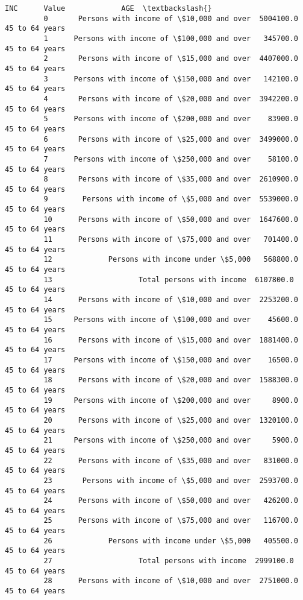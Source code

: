 \documentclass[11pt]{article}
\begin{document}
\begin{Verbatim}[commandchars=\\\{\}]
                                                     INC      Value             AGE  \textbackslash{}
         0       Persons with income of \$10,000 and over  5004100.0  45 to 64 years   
         1      Persons with income of \$100,000 and over   345700.0  45 to 64 years   
         2       Persons with income of \$15,000 and over  4407000.0  45 to 64 years   
         3      Persons with income of \$150,000 and over   142100.0  45 to 64 years   
         4       Persons with income of \$20,000 and over  3942200.0  45 to 64 years   
         5      Persons with income of \$200,000 and over    83900.0  45 to 64 years   
         6       Persons with income of \$25,000 and over  3499000.0  45 to 64 years   
         7      Persons with income of \$250,000 and over    58100.0  45 to 64 years   
         8       Persons with income of \$35,000 and over  2610900.0  45 to 64 years   
         9        Persons with income of \$5,000 and over  5539000.0  45 to 64 years   
         10      Persons with income of \$50,000 and over  1647600.0  45 to 64 years   
         11      Persons with income of \$75,000 and over   701400.0  45 to 64 years   
         12             Persons with income under \$5,000   568800.0  45 to 64 years   
         13                    Total persons with income  6107800.0  45 to 64 years   
         14      Persons with income of \$10,000 and over  2253200.0  45 to 64 years   
         15     Persons with income of \$100,000 and over    45600.0  45 to 64 years   
         16      Persons with income of \$15,000 and over  1881400.0  45 to 64 years   
         17     Persons with income of \$150,000 and over    16500.0  45 to 64 years   
         18      Persons with income of \$20,000 and over  1588300.0  45 to 64 years   
         19     Persons with income of \$200,000 and over     8900.0  45 to 64 years   
         20      Persons with income of \$25,000 and over  1320100.0  45 to 64 years   
         21     Persons with income of \$250,000 and over     5900.0  45 to 64 years   
         22      Persons with income of \$35,000 and over   831000.0  45 to 64 years   
         23       Persons with income of \$5,000 and over  2593700.0  45 to 64 years   
         24      Persons with income of \$50,000 and over   426200.0  45 to 64 years   
         25      Persons with income of \$75,000 and over   116700.0  45 to 64 years   
         26             Persons with income under \$5,000   405500.0  45 to 64 years   
         27                    Total persons with income  2999100.0  45 to 64 years   
         28      Persons with income of \$10,000 and over  2751000.0  45 to 64 years   

\end{Verbatim}
\end{document}
